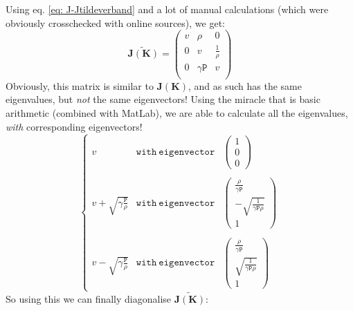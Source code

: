 \documentclass[a4paper]{article}
\begin{document}
Using eq. \ref{eq: J-Jtildeverband} and a lot of manual calculations (which were obviously crosschecked with online sources), we get: 
\begin{equation}
	\widetilde{\mathbf{J(K)}} = \left(\begin{matrix}
	v & \rho & 0 \\
	0 & v & \frac{1}{\rho}\\
	0 & \gamma \mathtt{P} & v\\
	\end{matrix}\right)
\end{equation}
Obviously, this matrix is similar to $\mathbf{J(K)}$, and as such has the same eigenvalues, but \emph{not} the same eigenvectors! Using the miracle that is basic arithmetic (combined with MatLab), we are able to calculate all the eigenvalues, \emph{with} corresponding eigenvectors!
\begin{equation}
	\left\{ 
	\begin{matrix}
	 v & \mathtt{with} \ \mathtt{eigenvector} & \left(\begin{array}{c}
	 1\\ 0 \\ 0
	 \end{array}\right)\\ 
	 \quad\\
	 v + \sqrt{\gamma\frac{ \mathtt{P}}{\rho}} & \mathtt{with} \ \mathtt{eigenvector} & \left(\begin{array}{c}
	 \frac{\rho}{\gamma\mathtt{P}}\\ -\sqrt{\frac{1}{\gamma\mathtt{P}\rho}} \\ 1
	 \end{array}\right)\\
	 \quad\\
	 v - \sqrt{\gamma\frac{ \mathtt{P}}{\rho}} & \mathtt{with} \ \mathtt{eigenvector} &\left(\begin{array}{c}
	\frac{\rho}{\gamma\mathtt{P}}\\ \sqrt{\frac{1}{\gamma\mathtt{P}\rho}} \\ 1
	 \end{array}\right)
	
	\end{matrix}
	\right. 
\end{equation}
So using this we can finally diagonalise $\widetilde{\mathbf{J(K)}}$: 
\end{document}
